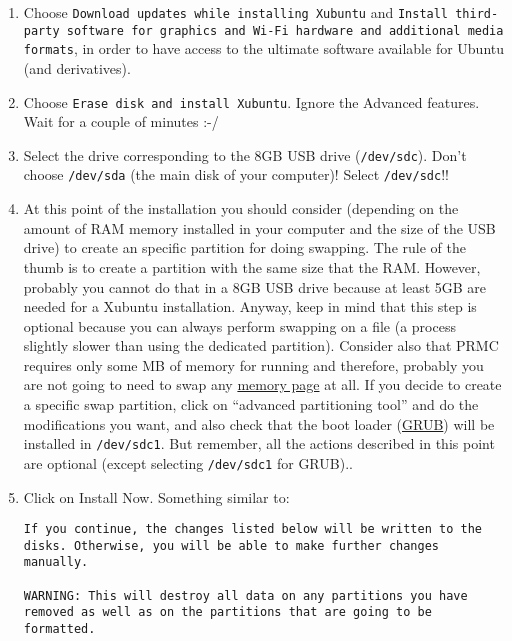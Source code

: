 \begin{enumerate}
\item Choose \texttt{Download updates while installing Xubuntu} and
  \texttt{Install third-party software for graphics and Wi-Fi hardware
    and additional media formats}, in order to have access to the
    ultimate software available for Ubuntu (and derivatives).

\item Choose \texttt{Erase disk and install Xubuntu}. Ignore the
  Advanced features. Wait for a couple of minutes :-/

\item Select the drive corresponding to the 8GB USB drive
  (\texttt{/dev/sdc}). Don't choose \texttt{/dev/sda} (the main disk of
  your computer)! Select \texttt{/dev/sdc}!!

\item At this point of the installation you should consider (depending
  on the amount of RAM memory installed in your computer and the size
  of the USB drive) to create an specific partition for doing
  swapping. The rule of the thumb is to create a partition with the
  same size that the RAM. However, probably you cannot do that in a
  8GB USB drive because at least 5GB are needed for a Xubuntu
  installation. Anyway, keep in mind that this step is optional
  because you can always perform swapping on a file (a process
  slightly slower than using the dedicated partition). Consider also
  that PRMC requires only some MB of memory for running and
  therefore, probably you are not going to need to swap any
  \href{https://en.wikipedia.org/wiki/Page_(computer_memory)}{memory
    page} at all. If you decide to create a specific swap partition,
  click on ``advanced partitioning tool'' and do the modifications you
  want, and also check that the boot loader
  (\href{https://www.gnu.org/software/grub/}{GRUB}) will be installed
  in \texttt{/dev/sdc1}. But remember, all the actions described in
  this point are optional (except selecting \texttt{/dev/sdc1} for
  GRUB)..

\item Click on Install Now. Something similar to:

\begin{verbatim}
If you continue, the changes listed below will be written to the disks. Otherwise, you will be able to make further changes manually.

WARNING: This will destroy all data on any partitions you have removed as well as on the partitions that are going to be formatted.


\end{verbatim}
\end{enumerate}
